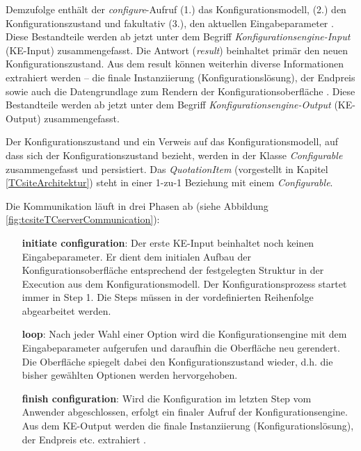 \documentclass[11pt, a4paper, titlepage, listof=totoc, bibliography=totoc, index=totoc, twoside, openright, headings=normal]{scrreprt}
\begin{document}
Demzufolge enthält der \emph{configure}-Aufruf (1.) das Konfigurationsmodell, (2.) den Konfigurationszustand und fakultativ (3.), den aktuellen Eingabeparameter \citep{tactonTCsiteApiDocu}. Diese Bestandteile werden ab jetzt unter dem Begriff \emph{Konfigurationsengine-Input} (KE-Input) zusammengefasst. Die Antwort (\emph{result}) beinhaltet primär den neuen Konfigurationszustand. Aus dem result können weiterhin diverse Informationen extrahiert werden --  die finale Instanziierung (Konfigurationslösung), der Endpreis sowie auch die Datengrundlage zum Rendern der Konfigurationsoberfläche \citep{tactonTCsiteApiDocu}. Diese Bestandteile werden ab jetzt unter dem Begriff \emph{Konfigurationsengine-Output} (KE-Output) zusammengefasst.

Der Konfigurationszustand und ein Verweis auf das Konfigurationsmodell, auf dass sich der Konfigurationszustand bezieht, werden in der Klasse \emph{Configurable} zusammengefasst und persistiert. Das \emph{QuotationItem} (vorgestellt in Kapitel  \ref{TCsiteArchitektur}) steht in einer 1-zu-1 Beziehung mit einem \emph{Configurable}.

Die Kommunikation läuft in drei Phasen ab (siehe Abbildung \ref{fig:tcsiteTCserverCommunication}):
\begin{enumerate}
\item[\textbf{initiate configuration}:]Der erste KE-Input beinhaltet noch keinen Eingabeparameter. Er dient dem initialen Aufbau der Konfigurationsoberfläche entsprechend der festgelegten Struktur in der Execution aus dem Konfigurationsmodell. Der Konfigurationsprozess startet immer in Step 1. Die Steps müssen in der vordefinierten Reihenfolge abgearbeitet werden.
\item[\textbf{loop}:] Nach jeder Wahl einer Option wird die Konfigurationsengine mit dem Eingabeparameter aufgerufen und daraufhin die Oberfläche neu gerendert. Die Oberfläche spiegelt dabei den Konfigurationszustand wieder, d.h. die bisher gewählten Optionen werden hervorgehoben.
\item[\textbf{finish configuration}:] Wird die Konfiguration im letzten Step vom Anwender abgeschlossen, erfolgt ein finaler Aufruf der Konfigurationsengine. Aus dem KE-Output werden die finale Instanziierung (Konfigurationslösung), der Endpreis etc. extrahiert \citep{tactonTCsiteDevelopmentManual}.
\end{enumerate}
\end{document}
